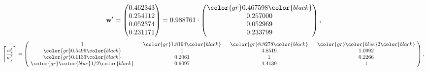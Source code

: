 \begin{example}
\begin{equation*}
\mathbf{w}^{\prime} =
\begin{pmatrix}
0.462343\\
0.254112\\
0.052374\\
0.231171
\end{pmatrix} =
0.988761\cdot
\begin{pmatrix}
\color{gr} 0.467598\color{black} \\
0.257000\\
0.052969\\
0.233799
\end{pmatrix},
\end{equation*}
\begin{equation*}
\left[ \frac{{w}^{\prime}_i}{{w}^{\prime}_j} \right] =
\begin{pmatrix}
$\,\,$ 1 $\,\,$ & $\,\,$\color{gr} 1.8194\color{black} $\,\,$ & $\,\,$\color{gr} 8.8278\color{black} $\,\,$ & $\,\,$\color{gr} \color{blue} 2\color{black} $\,\,$ \\
$\,\,$\color{gr} 0.5496\color{black} $\,\,$ & $\,\,$ 1 $\,\,$ & $\,\,$4.8519$\,\,$ & $\,\,$1.0992  $\,\,$ \\
$\,\,$\color{gr} 0.1133\color{black} $\,\,$ & $\,\,$0.2061$\,\,$ & $\,\,$ 1 $\,\,$ & $\,\,$0.2266 $\,\,$ \\
$\,\,$\color{gr} \color{blue}  1/2\color{black} $\,\,$ & $\,\,$0.9097$\,\,$ & $\,\,$4.4139$\,\,$ & $\,\,$ 1  $\,\,$ \\
\end{pmatrix},
\end{equation*}
\end{example}
\newpage
